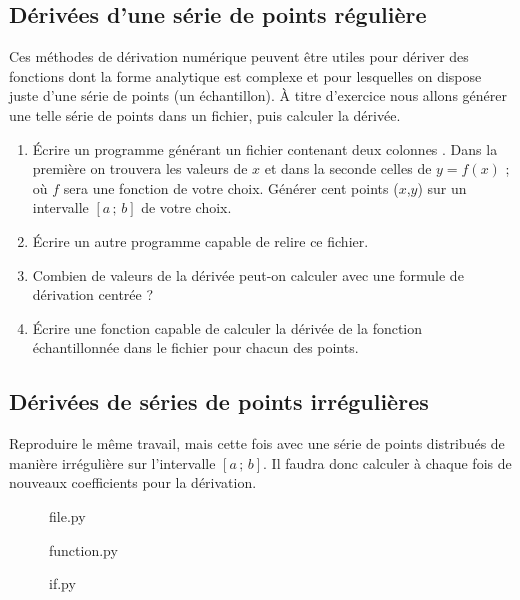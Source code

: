 \subsection{Dérivées d'une série de points régulière \sc{[Facultatif]}}

Ces méthodes de dérivation numérique  peuvent être utiles pour dériver
des fonctions dont la forme analytique est complexe et pour lesquelles
on dispose juste d'une série de points (un échantillon).
À titre d'exercice nous allons
générer une  telle série de points  dans un fichier, puis  calculer la
dérivée.

\begin{enumerate}
\item Écrire un programme générant  un fichier contenant deux colonnes
  . Dans  la première  on trouvera les  valeurs de  $x$ et
  dans la seconde celles de $y=f(x)$ ; où $f$ sera une fonction de votre
  choix. Générer  cent points ($x$,$y$) sur un  intervalle $[a\,;\,b]$  de votre
  choix.
\item Écrire un autre programme capable de relire ce fichier.
\item  Combien de  valeurs de  la  dérivée peut-on  calculer avec  une
  formule de dérivation centrée ?
\item  Écrire  une fonction  capable  de  calculer  la dérivée  de  la
  fonction échantillonnée dans le fichier pour chacun des points.
\end{enumerate}

\subsection{Dérivées de séries de points irrégulières \sc{[Facultatif]}}

Reproduire le même  travail, mais cette fois avec une  série de points
distribués  de manière  irrégulière sur  l'intervalle $[a\,;\,b]$.  Il
faudra donc  calculer à chaque  fois de nouveaux coefficients  pour la
dérivation.

\begin{figure}
\caption{file.py}
\end{figure}

\begin{figure}
\caption{function.py}
\end{figure}

\begin{figure}
\caption{if.py}
\end{figure}


